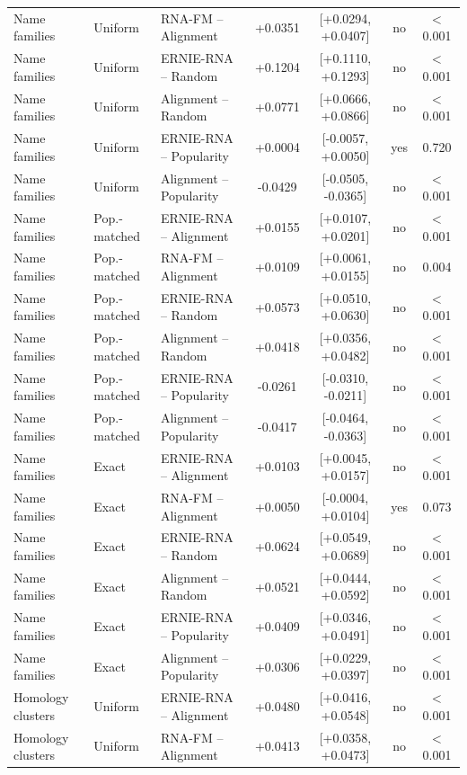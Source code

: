 {\begin{longtable}{lllcccc}
Name families & Uniform & RNA-FM -- Alignment & +0.0351 & [+0.0294, +0.0407] & no & $<$0.001\\
Name families & Uniform & ERNIE-RNA -- Random & +0.1204 & [+0.1110, +0.1293] & no & $<$0.001\\
Name families & Uniform & Alignment -- Random & +0.0771 & [+0.0666, +0.0866] & no & $<$0.001\\
Name families & Uniform & ERNIE-RNA -- Popularity & +0.0004 & [-0.0057, +0.0050] & yes & 0.720\\
Name families & Uniform & Alignment -- Popularity & -0.0429 & [-0.0505, -0.0365] & no & $<$0.001\\
Name families & Pop.-matched & ERNIE-RNA -- Alignment & +0.0155 & [+0.0107, +0.0201] & no & $<$0.001\\
Name families & Pop.-matched & RNA-FM -- Alignment & +0.0109 & [+0.0061, +0.0155] & no & 0.004\\
Name families & Pop.-matched & ERNIE-RNA -- Random & +0.0573 & [+0.0510, +0.0630] & no & $<$0.001\\
Name families & Pop.-matched & Alignment -- Random & +0.0418 & [+0.0356, +0.0482] & no & $<$0.001\\
Name families & Pop.-matched & ERNIE-RNA -- Popularity & -0.0261 & [-0.0310, -0.0211] & no & $<$0.001\\
Name families & Pop.-matched & Alignment -- Popularity & -0.0417 & [-0.0464, -0.0363] & no & $<$0.001\\
Name families & Exact & ERNIE-RNA -- Alignment & +0.0103 & [+0.0045, +0.0157] & no & $<$0.001\\
Name families & Exact & RNA-FM -- Alignment & +0.0050 & [-0.0004, +0.0104] & yes & 0.073\\
Name families & Exact & ERNIE-RNA -- Random & +0.0624 & [+0.0549, +0.0689] & no & $<$0.001\\
Name families & Exact & Alignment -- Random & +0.0521 & [+0.0444, +0.0592] & no & $<$0.001\\
Name families & Exact & ERNIE-RNA -- Popularity & +0.0409 & [+0.0346, +0.0491] & no & $<$0.001\\
Name families & Exact & Alignment -- Popularity & +0.0306 & [+0.0229, +0.0397] & no & $<$0.001\\
\midrule
Homology clusters & Uniform & ERNIE-RNA -- Alignment & +0.0480 & [+0.0416, +0.0548] & no & $<$0.001\\
Homology clusters & Uniform & RNA-FM -- Alignment & +0.0413 & [+0.0358, +0.0473] & no & $<$0.001\\

\end{longtable}}
